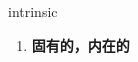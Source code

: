 
\begin{frame}
{\huge intrinsic}
\begin{center}
\begin{enumerate}\Large
  \item \textbf{固有的，内在的}
\end{enumerate}
\end{center}
\end{frame}
